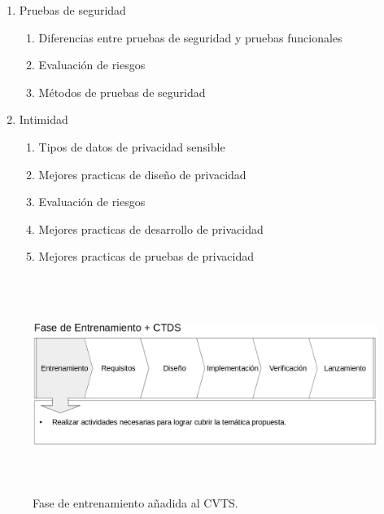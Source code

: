\documentclass[runningheads,a4paper]{llncs}
\begin{document}
\begin{enumerate}
\begin{enumerate}
\begin{enumerate}
\begin{enumerate}
	\end{enumerate}
\item Pruebas de seguridad
	\begin{enumerate}
		\item Diferencias entre pruebas de seguridad y pruebas funcionales		
		\item Evaluación de riesgos	
		\item Métodos de pruebas de seguridad\\
		
	\end{enumerate}
\item Intimidad
	\begin{enumerate}
		\item Tipos de datos de privacidad sensible
		\item Mejores practicas de diseño de privacidad
		\item Evaluación de riesgos
		\item Mejores practicas de desarrollo de privacidad
		\item Mejores practicas de pruebas de privacidad\\
	\end{enumerate}
\end{enumerate}

\begin{figure}
\centering
\includegraphics[height=7.0cm, width=12.0cm]{sa_figura_2}
\caption{Fase de entrenamiento añadida al \gls{CVTS}.}
\label{fig:example}
\end{figure}

\end{enumerate}


\end{enumerate}
\end{document}
